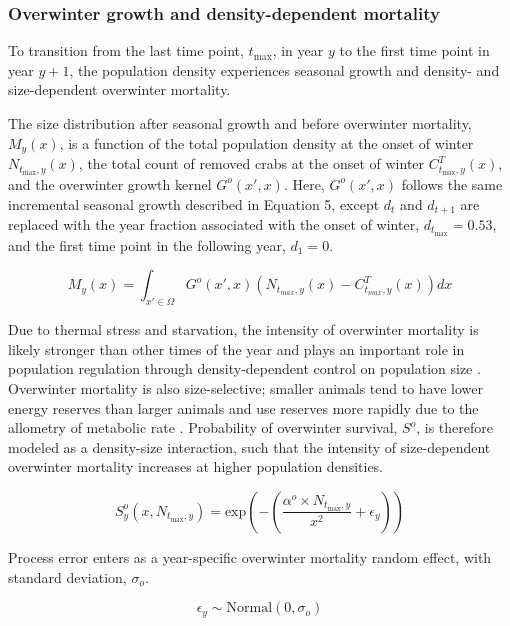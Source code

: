 \documentclass{article}
\begin{document}
\subsubsection*{Overwinter growth and density-dependent mortality}

To transition from the last time point, $t_{\text{max}}$, in year $y$ to the first time point in year $y+1$, the population density experiences seasonal growth and density- and size-dependent overwinter mortality. 

The size distribution after seasonal growth and before overwinter mortality, $M_y(x)$, is a function of the total population density at the onset of winter $N_{t_{\text{max}}, y}(x)$, the total count of removed crabs at the onset of winter $C^T_{t_{\text{max}}, y}(x)$, and the overwinter growth kernel $G^o(x',x)$. Here, $G^o(x',x)$ follows the same incremental seasonal growth described in Equation 5, except $d_t$ and $d_{t+1}$ are replaced with the year fraction associated with the onset of winter, $d_{t_\text{max}} = 0.53$, and the first time point in the following year, $d_1 = 0$.

\begin{equation}
M_y(x) = \int_{x' \in \Omega} G^o(x',x) (N_{t_{max},y}(x) - C^T_{t_{max},y}(x))dx
\end{equation}

Due to thermal stress and starvation, the intensity of overwinter mortality is likely stronger than other times of the year and plays an important role in population regulation through density-dependent control on population size \parencite{henderson1988size}. Overwinter mortality is also size-selective; smaller animals tend to have lower energy reserves than larger animals and use reserves more rapidly due to the allometry of metabolic rate \parencite{hurst2007causes}. Probability of overwinter survival, $S^o$, is therefore modeled as a density-size interaction, such that the intensity of size-dependent overwinter mortality increases at higher population densities.

\begin{equation}
S_y^o(x,N_{t_{\text{max}},y}) = \text{exp}\left(-(\frac{\alpha^o \times N_{t_{\text{max}},y}}{x^2} + \epsilon_y)\right)
\end{equation}

Process error enters as a year-specific overwinter mortality random effect, with standard deviation, $\sigma_o$.

\begin{equation}
\epsilon_y \sim \text{Normal}(0, \sigma_o)
\end{equation}
\end{document}
